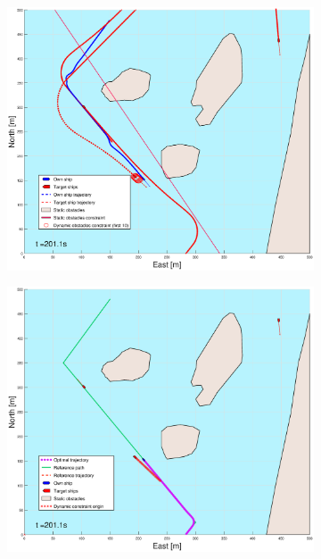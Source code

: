 \begin{figure}[ht]
\begin{subfigure}[b]{0.494\textwidth}
        \subcaption{}
    \end{subfigure}
    \hfill
    \\
    \begin{subfigure}[b]{0.494\textwidth}
        \centering
        \includegraphics[width=\textwidth]{Images/Figures/Helloya_Rev/_Simple_1fig1_time=201}
        \subcaption{}
    \end{subfigure}
    \hfill
    \begin{subfigure}[b]{0.494\textwidth}
        \centering
        \includegraphics[width=\textwidth]{Images/Figures/Helloya_Rev/_Simple_1fig999_time=201}

\end{subfigure}
\end{figure}
